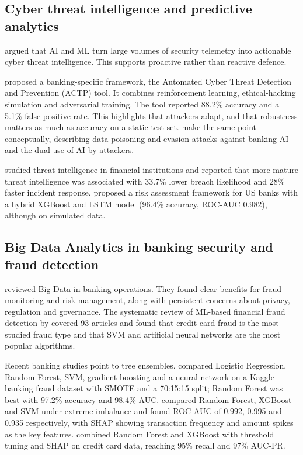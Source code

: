 \documentclass[12pt,a4paper]{article}
\begin{document}
\subsection{Cyber threat intelligence and predictive analytics}
\citet{montasari2020application} argued that AI and ML turn large volumes of security telemetry into actionable cyber threat intelligence. This supports proactive rather than reactive defence.

\citet{padmanaban2026actp} proposed a banking-specific framework, the Automated Cyber Threat Detection and Prevention (ACTP) tool. It combines reinforcement learning, ethical-hacking simulation and adversarial training. The tool reported 88.2\% accuracy and a 5.1\% false-positive rate. This highlights that attackers adapt, and that robustness matters as much as accuracy on a static test set. \citet{kovacevic2025ai} make the same point conceptually, describing data poisoning and evasion attacks against banking AI and the dual use of AI by attackers.

\citet{eshra2025threat} studied threat intelligence in financial institutions and reported that more mature threat intelligence was associated with 33.7\% lower breach likelihood and 28\% faster incident response. \citet{ullah2026risk} proposed a risk assessment framework for US banks with a hybrid XGBoost and LSTM model (96.4\% accuracy, ROC-AUC 0.982), although on simulated data.

\subsection{Big Data Analytics in banking security and fraud detection}
\citet{hasan2023bigdata} reviewed Big Data in banking operations. They found clear benefits for fraud monitoring and risk management, along with persistent concerns about privacy, regulation and governance. The systematic review of ML-based financial fraud detection by \citet{ali2022financial} covered 93 articles and found that credit card fraud is the most studied fraud type and that SVM and artificial neural networks are the most popular algorithms.

Recent banking studies point to tree ensembles. \citet{sanda2026banking} compared Logistic Regression, Random Forest, SVM, gradient boosting and a neural network on a Kaggle banking fraud dataset with SMOTE and a 70:15:15 split; Random Forest was best with 97.2\% accuracy and 98.4\% AUC. \citet{dhammayogi2026early} compared Random Forest, XGBoost and SVM under extreme imbalance and found ROC-AUC of 0.992, 0.995 and 0.935 respectively, with SHAP showing transaction frequency and amount spikes as the key features. \citet{baisholan2025fraudx} combined Random Forest and XGBoost with threshold tuning and SHAP on credit card data, reaching 95\% recall and 97\% AUC-PR.
\end{document}
